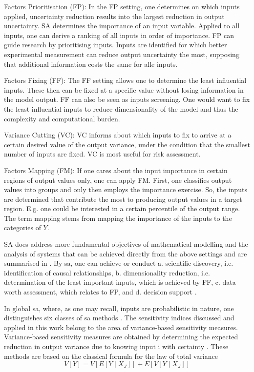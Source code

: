 Factors Prioritisation (FP): In the FP setting, one determines on which inputs applied, uncertainty reduction results into the largest reduction in output uncertainty. SA determines the importance of an input variable. Applied to all inputs, one can derive a ranking of all inputs in order of importance. FP can guide research by prioritising inputs. Inputs are identified for which better experimental measurement can reduce output uncertainty the most, supposing that additional information costs the same for alle inputs.

Factors Fixing (FF): The FF setting allows one to determine the least influential inputs. These then can be fixed at a specific value without losing information in the model output. FF can also be seen as inputs screening. One would want to fix the least influential inputs to reduce dimensionality of the model and thus the complexity and computational burden.

Variance Cutting (VC): VC informs about which inputs to fix to arrive at a certain desired value of the output variance, under the condition that the smallest number of inputs are fixed. VC is most useful for risk assessment.

Factors Mapping (FM): If one cares about the input importance in certain regions of output values only, one can apply FM. First, one classifies output values into groups and only then employs the importance exercise. So, the inputs are determined that contribute the most to producing output values in a target region. E.g. one could be interested in a certain percentile of the output range. The term mapping stems from mapping the importance of the inputs to the categories of $Y$.

SA does address more fundamental objectives of mathematical modelling and the analysis of systems that can be achieved directly from the above settings and are summarised in \citet{R21}. By sa, one can achieve or conduct a. scientific discovery, i.e. identification of causal relationships, b. dimensionality reduction, i.e. determination of the least important inputs, which is achieved by FF, c. data worth assessment, which relates to FP, and d. decision support \citep{R21}.

In global sa, where, as one may recall, inputs are probabilistic in nature, one distinguishes six classes of sa methods \citep{BP16}. The sensitivity indices discussed and applied in this work belong to the area of variance-based sensitivity measures. Variance-based sensitivity measures are obtained by determining the expected reduction in output variance due to knowing input i with certainty \citep{BP16}. These methods are based on the classical formula for the law of total variance
\begin{equation}
V[Y]= V[E[Y \mid X_J]] + E[V[Y \mid X_J]]
\end{equation}

